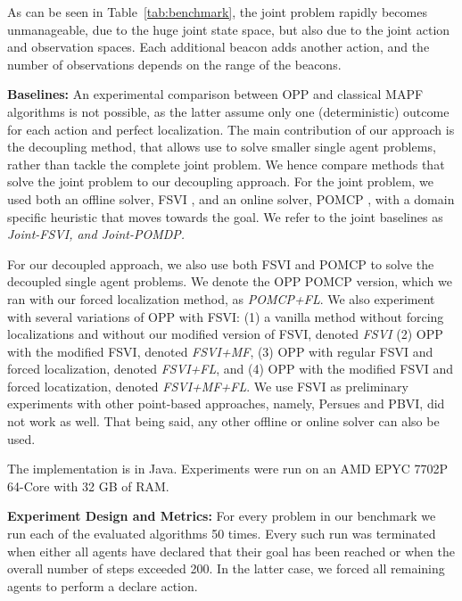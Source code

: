 \documentclass[letterpaper]{article} %
\newcommand{\guy}[1]{\textcolor{blue}{[Guy: #1]}}
\begin{document}
As can be seen in Table~\ref{tab:benchmark}, the joint problem rapidly becomes unmanageable, due to the huge joint state space, but also due to the joint action and observation spaces. Each additional beacon adds another action, and the number of observations depends on the range of the beacons.


\noindent\textbf{Baselines:} An experimental comparison between OPP and classical MAPF algorithms is not possible, as the latter assume only one (deterministic) outcome for each action and perfect localization.
The main contribution of our approach is the decoupling method, that allows use to solve smaller single agent problems, rather than tackle the complete joint problem. We hence compare methods that solve the joint problem to our decoupling approach. For the joint problem, we used both an offline solver, FSVI \cite{shani2013survey}, and an online solver, POMCP \cite{silver2010monte}, with a domain specific heuristic that moves towards the goal. We refer to the joint baselines as \em{Joint-FSVI}, and \em{Joint-POMDP}. %

For our decoupled approach, we also use both FSVI and POMCP to solve the decoupled single agent problems. We denote the OPP POMCP version, which we ran with our forced localization method, as \emph{POMCP+FL}.
We also experiment with several variations of OPP with FSVI: (1) a vanilla method without forcing localizations and without our modified version of FSVI, denoted \emph{FSVI} (2) OPP with the modified FSVI, denoted \emph{FSVI+MF},  (3) OPP with regular FSVI and forced localization, denoted \emph{FSVI+FL}, and (4) OPP with the modified FSVI and forced locatization, denoted \emph{FSVI+MF+FL}.
We use FSVI as preliminary experiments with other point-based approaches, namely, Persues and PBVI, did not work as well. That being said, any other offline or online solver can also be used.




The implementation is in Java. Experiments were run on an AMD\textsc{\textregistered} EPYC 7702P 64-Core with 32 GB of RAM.



\noindent\textbf{Experiment Design and Metrics:}
For every problem in our benchmark we run each of the evaluated algorithms 50 times.
Every such run was terminated when either all agents have declared that their goal has been reached or when the overall number of steps exceeded 200. In the latter case, we forced all remaining agents to perform a declare action.
\end{document}
